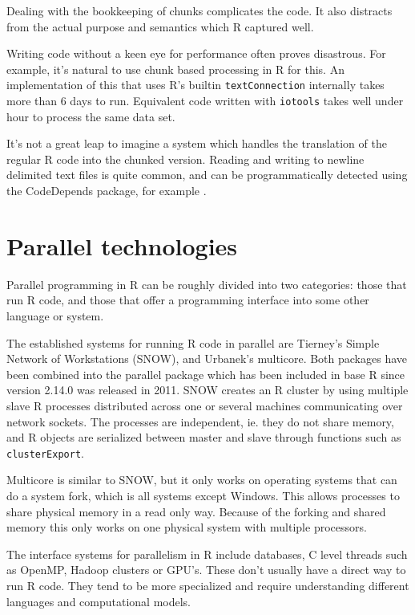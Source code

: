 \documentclass[12pt]{article}
\begin{document}
Dealing with the bookkeeping of chunks complicates the code.  It also
distracts from the actual purpose and semantics which R captured well.

Writing code without a keen eye for performance often proves disastrous.
For example, it's natural to use chunk based processing in R for this. An
implementation of this that uses R's builtin \texttt{textConnection}
internally takes more than 6 days to run. Equivalent code written with
\texttt{iotools} takes well under hour to process the same data set.

It's not a great leap to imagine a system which handles the translation
of the regular R code into the chunked version. Reading and writing
to newline delimited text files is quite common, and can be
programmatically detected using the CodeDepends package, for example
\cite{R-CodeDepends}.

\section{Parallel technologies}

Parallel programming in R can be roughly divided into two categories: those
that run R code, and those that offer a programming interface into some
other language or system. 

The established systems for running R code in parallel are Tierney's Simple
Network of Workstations (SNOW), and Urbanek's multicore. Both packages have
been combined into the parallel package which has been included in base R since
version 2.14.0 was released in 2011. SNOW creates
an R cluster by using multiple slave R processes distributed across one or
several machines communicating over network sockets. The processes are independent,
ie. they do not share memory, and R objects are serialized
between master and slave through functions such as \texttt{clusterExport}.

Multicore is similar to SNOW, but it only works on operating systems that can
do a system fork, which is all systems except Windows. This allows
processes to share physical memory in a read only way. Because of the
forking and shared memory this only works on one physical system with
multiple processors.

The interface systems for parallelism in R include databases, C level
threads such as OpenMP, Hadoop clusters or GPU's. These don't usually have
a direct way to run R code. They tend to be more specialized and require
understanding different languages and computational models.
\end{document}
